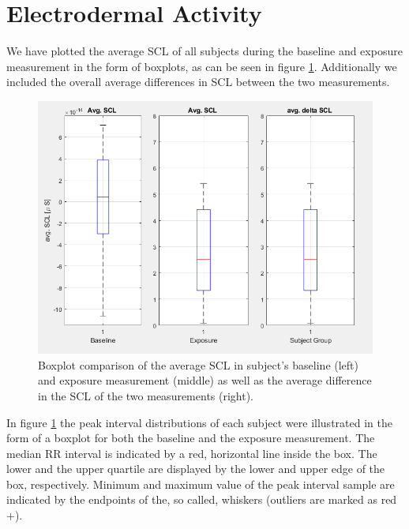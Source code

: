 
\section{Electrodermal Activity}

We have plotted the average SCL of all subjects during the baseline and exposure measurement in the form of boxplots, as can be seen in figure \ref{SCLbpImg}. Additionally we included the overall average differences in SCL between the two measurements.
 
\begin{figure}[h]
\centering
\includegraphics[width=1\textwidth]{images/avgSCL.png}
\caption{Boxplot comparison of the average SCL in subject's baseline (left) and exposure measurement (middle) as well as the average difference in the SCL of the two measurements (right).}
\label{SCLbpImg}
\end{figure}

\newpage
In figure \ref{SCLbpImg} the peak interval distributions of each subject were illustrated in the form of a boxplot for both the baseline and the exposure measurement. The median RR interval is indicated by a red, horizontal line inside the box. The lower and the upper quartile are displayed by the lower and upper edge of the box, respectively. Minimum and maximum value of the peak interval sample are indicated by the endpoints of the, so called,  whiskers (outliers are marked as red +).

